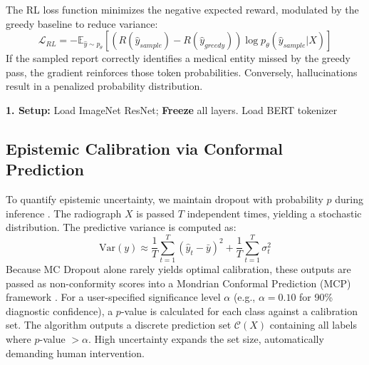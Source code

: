 \documentclass[10pt,a4paper,twocolumn]{article}
\begin{document}
The RL loss function minimizes the negative expected reward, modulated by the greedy baseline to reduce variance:
\begin{equation}
    \mathcal{L}_{RL} = - \mathbb{E}_{\hat{y} \sim p_\theta} [ (R(\hat{y}_{sample}) - R(\hat{y}_{greedy})) \log p_\theta(\hat{y}_{sample} | X) ]
\end{equation}
If the sampled report correctly identifies a medical entity missed by the greedy pass, the gradient reinforces those token probabilities. Conversely, hallucinations result in a penalized probability distribution.

\begin{algorithm}[h]
\label{alg:training}
\SetAlgoLined
\DontPrintSemicolon
{}

\textbf{1. Setup:} Load ImageNet ResNet; \textbf{Freeze} all layers. Load BERT tokenizer\;
\caption{SCST Factuality Optimization}
\end{algorithm}

\subsection{Epistemic Calibration via Conformal Prediction}
To quantify epistemic uncertainty, we maintain dropout with probability $p$ during inference \cite{gal2016dropout}. The radiograph $X$ is passed $T$ independent times, yielding a stochastic distribution. The predictive variance is computed as:
\begin{equation}
    \text{Var}(y) \approx \frac{1}{T} \sum_{t=1}^{T} (\hat{y}_t - \bar{y})^2 + \frac{1}{T} \sum_{t=1}^{T} \sigma_t^2
\end{equation}
Because MC Dropout alone rarely yields optimal calibration, these outputs are passed as non-conformity scores into a Mondrian Conformal Prediction (MCP) framework \cite{angelopoulos2020gentle}. For a user-specified significance level $\alpha$ (e.g., $\alpha=0.10$ for 90\% diagnostic confidence), a $p$-value is calculated for each class against a calibration set. The algorithm outputs a discrete prediction set $\mathcal{C}(X)$ containing all labels where $p$-value $> \alpha$. High uncertainty expands the set size, automatically demanding human intervention.
\end{document}
